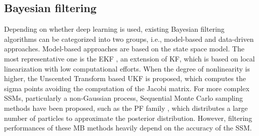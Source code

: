 

\subsection{Bayesian filtering}

Depending on whether deep learning is used, existing Bayesian filtering algorithms can be categorized into two groups, i.e., model-based and data-driven approaches.
Model-based approaches are based on the state space model. The most representative one is the EKF \cite {4982682, 1098671}, an extension of KF, which is based on local linearization with low computational efforts.
When the degree of nonlinearity is higher, the Unscented Transform based UKF \cite {Julier1997NewEO} is proposed, which computes the sigma points avoiding the computation of the Jacobi matrix.
For more complex SSMs, particularly a non-Gaussian process, Sequential Monte Carlo sampling methods have been proposed, such as the PF family  \cite{DELMORAL1997653, 7079001}, which distributes a large number of particles to approximate the posterior distribution.
However, filtering performances of these MB methods heavily depend on the accuracy of the SSM.

